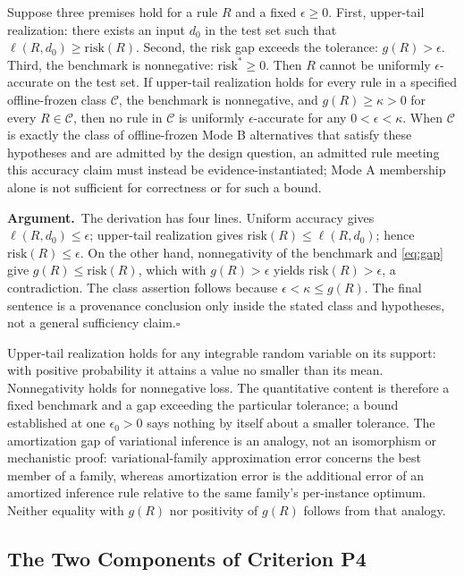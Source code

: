 \documentclass[twoside,11pt]{article}
\newcommand{\argument}{\par\medskip\noindent\textbf{Argument.}\ }
\newcommand{\qedbox}{\hfill$\square$}
\begin{document}
\begin{lemma}
Suppose three premises hold for a rule $R$ and a fixed $\epsilon\geq0$. First, upper-tail realization: there exists an input $d_0$ in the test set such that $\ell(R,d_0)\geq\mathrm{risk}(R)$. Second, the risk gap exceeds the tolerance: $g(R)>\epsilon$. Third, the benchmark is nonnegative: $\mathrm{risk}^*\geq0$. Then $R$ cannot be uniformly $\epsilon$-accurate on the test set. If upper-tail realization holds for every rule in a specified offline-frozen class $\mathcal{C}$, the benchmark is nonnegative, and $g(R)\geq\kappa>0$ for every $R\in\mathcal{C}$, then no rule in $\mathcal{C}$ is uniformly $\epsilon$-accurate for any $0<\epsilon<\kappa$. When $\mathcal{C}$ is exactly the class of offline-frozen Mode B alternatives that satisfy these hypotheses and are admitted by the design question, an admitted rule meeting this accuracy claim must instead be evidence-instantiated; Mode A membership alone is not sufficient for correctness or for such a bound.
\end{lemma}

\argument The derivation has four lines. Uniform accuracy gives $\ell(R,d_0)\leq\epsilon$; upper-tail realization gives $\mathrm{risk}(R)\leq\ell(R,d_0)$; hence $\mathrm{risk}(R)\leq\epsilon$. On the other hand, nonnegativity of the benchmark and \eqref{eq:gap} give $g(R)\leq\mathrm{risk}(R)$, which with $g(R)>\epsilon$ yields $\mathrm{risk}(R)>\epsilon$, a contradiction. The class assertion follows because $\epsilon<\kappa\leq g(R)$. The final sentence is a provenance conclusion only inside the stated class and hypotheses, not a general sufficiency claim.\qedbox

Upper-tail realization holds for any integrable random variable on its support: with positive probability it attains a value no smaller than its mean. Nonnegativity holds for nonnegative loss. The quantitative content is therefore a fixed benchmark and a gap exceeding the particular tolerance; a bound established at one $\epsilon_0>0$ says nothing by itself about a smaller tolerance. The amortization gap of variational inference \citep{cremer2018} is an analogy, not an isomorphism or mechanistic proof: variational-family approximation error concerns the best member of a family, whereas amortization error is the additional error of an amortized inference rule relative to the same family's per-instance optimum. Neither equality with $g(R)$ nor positivity of $g(R)$ follows from that analogy.

\subsection{The Two Components of Criterion P4}
\label{sec:p4}%
\end{document}
